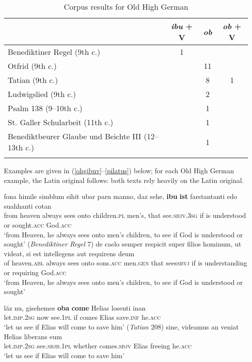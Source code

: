 \begin{table}
\begin{tabular}{ lccc }
\lsptoprule
{} & \textit{ibu} + V & \textit{ob} & \textit{ob} + V\\\midrule
Benediktiner Regel (9th c.)& 1 & {} & {}\\
Otfrid (9th c.) & {} & 11 & {}\\
Tatian (9th c.) & {} & 8 & 1\\
Ludwigslied  (9th c.)& {} & 2 & {}\\
Psalm 138 (9--10th c.)& {} & 1 & {}\\
St. Galler Schularbeit (11th c.)& {} & 1 & {}\\
Benediktbeurer Glaube und Beichte III (12--13th c.) & {} & 1 & {}\\
\lspbottomrule
\end{tabular}
\caption{Corpus results for Old High German\label{tableohg}}
\end{table}

Examples are given in (\ref{ohgibuv}--\ref{pilatus}) below; for each Old High German example, the Latin original follows: both texts rely heavily on the Latin original.

\ea
\ea \gll fona himile simblum sihit ubar parn manno, daz sehe, \textbf{ibu} \textbf{ist} farstantanti edo suahhanti cotan \label{ohgibuv}\\
from heaven always sees onto children.\textsc{pl} men's, that see.\textsc{sbjv.3sg} if is understood or sought.\textsc{acc} God.\textsc{acc}\\
\glt `from Heaven, he always sees onto men's children, to see if God is understood or sought' (\textit{Benediktiner Regel} 7)
\ex \gll de caelo semper respicit super filios hominum, ut videat, si est intellegens aut requirens deum\\
of heaven.\textsc{abl} always sees onto sons.\textsc{acc} men.\textsc{gen} that sees\textsc{sbvj} if is understanding or requiring God.\textsc{acc}\\
\glt `from Heaven, he always sees onto men's children, to see if God is understood or sought'
\z
\z

\ea
\ea \gll láz nu, gisehemes \textbf{oba} \textbf{come} Helias losenti inan \label{ohgobv}\\
let.\textsc{imp.2sg} now see.\textsc{1pl} if comes Elias save.\textsc{inf} he.\textsc{acc}\\
\glt `let us see if Elias will come to save him' (\textit{Tatian} 208)
\ex \gll sine, videamus an veniat Helias liberans eum\\
let.\textsc{imp.2sg} see.\textsc{sbjb.1pl} whether comes.\textsc{sbjv} Elias freeing he.\textsc{acc}\\
\glt `let us see if Elias will come to save him'
\z
\z

